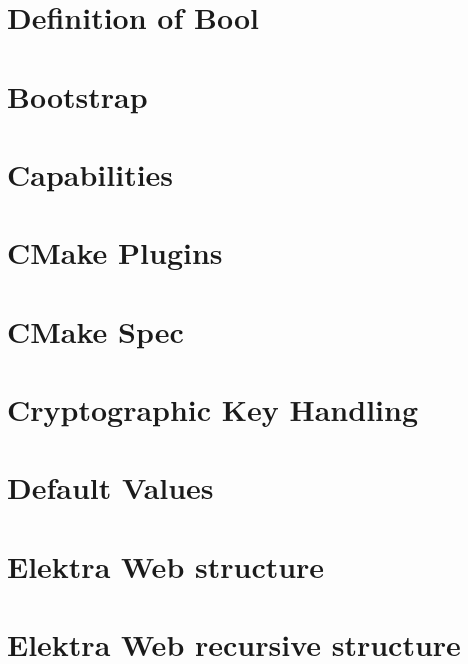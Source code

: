 \documentclass[twoside]{book}
\newcommand{\+}{\discretionary{\mbox{\scriptsize$\hookleftarrow$}}{}{}}
\begin{document}
\chapter{Definition of Bool}
\label{doc_decisions_bool_md}

\chapter{Bootstrap}
\label{doc_decisions_bootstrap_md}

\chapter{Capabilities}
\label{doc_decisions_capabilities_md}

\chapter{C\+Make Plugins}
\label{doc_decisions_cmake_plugins_md}

\chapter{C\+Make Spec}
\label{doc_decisions_cmake_spec_md}

\chapter{Cryptographic Key Handling}
\label{doc_decisions_cryptograhic_key_handling_md}

\chapter{Default Values}
\label{doc_decisions_default_values_md}

\chapter{Elektra Web structure}
\label{doc_decisions_elektra_web_md}

\chapter{Elektra Web recursive structure}
\label{doc_decisions_elektra_web_recursive_md}

\end{document}

